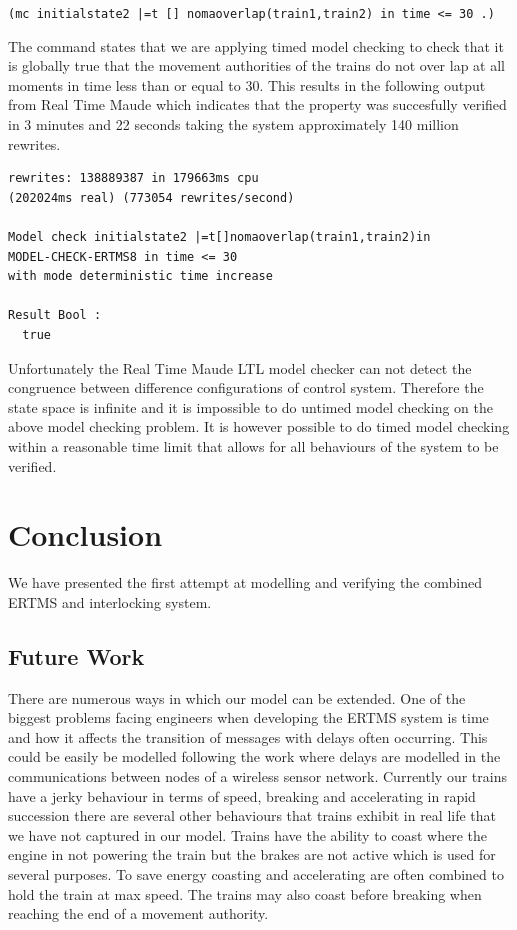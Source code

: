 \begin{center}
\texttt{(mc initialstate2 |=t [] nomaoverlap(train1,train2) in time <= 30 .)}
\end{center}
The command states that we are applying timed model checking to check that it is globally true that the movement authorities of the trains do not over lap at all moments in time less than or equal to 30. This results in the following output from Real Time Maude which indicates that the property was succesfully verified in 3 minutes and 22 seconds taking the system approximately 140 million rewrites.
\begin{lstlisting}[caption = No overlapping movement authorities model checking result]
rewrites: 138889387 in 179663ms cpu 
(202024ms real) (773054 rewrites/second)

Model check initialstate2 |=t[]nomaoverlap(train1,train2)in 
MODEL-CHECK-ERTMS8 in time <= 30 
with mode deterministic time increase

Result Bool :
  true
\end{lstlisting}

Unfortunately the Real Time Maude LTL model checker can not detect the congruence between difference configurations of control system. Therefore the state space is infinite and it is impossible to do untimed model checking on the above model checking problem. It is however possible to do timed model checking within a reasonable time limit that allows for all behaviours of the system to be verified.

\section{Conclusion}
 We have presented the first attempt at modelling and verifying the combined ERTMS and interlocking system.
\subsection*{Future Work}
There are numerous ways in which our model can be extended. One of the biggest problems facing engineers when developing the ERTMS system is time and how it affects the transition of messages with delays often occurring. This could be easily be modelled following the work \cite{PO07} where delays are modelled in the communications between nodes of a wireless sensor network. Currently our trains have a jerky behaviour in terms of speed, breaking and accelerating in rapid succession there are several other behaviours that trains exhibit in real life that we have not captured in our model. Trains have the ability to coast where the engine in not powering the train but the brakes are not active which is used for several purposes. To save energy coasting and accelerating are often combined to hold the train at max speed. The trains may also coast before breaking when reaching the end of a movement authority.

